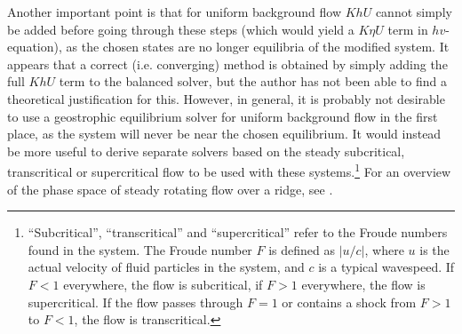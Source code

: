 Another important point is that for uniform background flow $KhU$ cannot simply be added before going through these steps (which would yield a $K\eta U$ term in $hv$-equation), as the chosen states are no longer equilibria of the modified system. It appears that a correct (i.e. converging) method is obtained by simply adding the full $KhU$ term to the balanced solver, but the author has not been able to find a theoretical justification for this. However, in general, it is probably not desirable to use a geostrophic equilibrium solver for uniform background flow in the first place, as the system will never be near the chosen equilibrium. It would instead be more useful to derive separate solvers based on the steady subcritical, transcritical or supercritical flow to be used with these systems.\footnote{``Subcritical'', ``transcritical'' and ``supercritical'' refer to the Froude numbers found in the system. The Froude number $F$ is defined as $|u/c|$, where $u$ is the actual velocity of fluid particles in the system, and $c$ is a typical wavespeed. If $F < 1$ everywhere, the flow is subcritical, if $F > 1$ everywhere, the flow is supercritical. If the flow passes through $F = 1$ or contains a shock from $F > 1$ to $F < 1$, the flow is transcritical.} For an overview of the phase space of steady rotating flow over a ridge, see \citet{esler2005steady}.